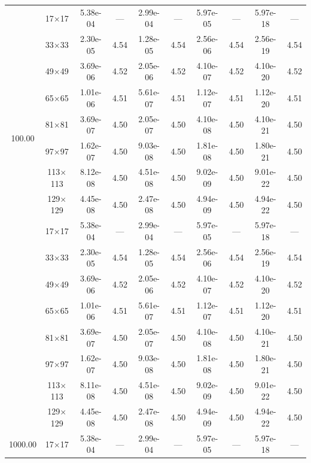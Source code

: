 \begin{table}[H]
{\begin{tabular*}{\textwidth}{@{\extracolsep\fill}c|c|cc|cc|cc|cc@{}}
                \midrule
                \multirow{10}{*}{100.00} & 17$\times$17 & 5.38e-04 & --- & 2.99e-04 & --- & 5.97e-05 & --- & 5.97e-18 & --- \\
                & 33$\times$33 & 2.30e-05 & 4.54 & 1.28e-05 & 4.54 & 2.56e-06 & 4.54 & 2.56e-19 & 4.54 \\
                & 49$\times$49 & 3.69e-06 & 4.52 & 2.05e-06 & 4.52 & 4.10e-07 & 4.52 & 4.10e-20 & 4.52 \\
                & 65$\times$65 & 1.01e-06 & 4.51 & 5.61e-07 & 4.51 & 1.12e-07 & 4.51 & 1.12e-20 & 4.51 \\
                & 81$\times$81 & 3.69e-07 & 4.50 & 2.05e-07 & 4.50 & 4.10e-08 & 4.50 & 4.10e-21 & 4.50 \\
                & 97$\times$97 & 1.62e-07 & 4.50 & 9.03e-08 & 4.50 & 1.81e-08 & 4.50 & 1.80e-21 & 4.50 \\
                & 113$\times$113 & 8.12e-08 & 4.50 & 4.51e-08 & 4.50 & 9.02e-09 & 4.50 & 9.01e-22 & 4.50 \\
                & 129$\times$129 & 4.45e-08 & 4.50 & 2.47e-08 & 4.50 & 4.94e-09 & 4.50 & 4.94e-22 & 4.50 \\
                \midrule
                \multirow{10}{*}{400.00} & 17$\times$17 & 5.38e-04 & --- & 2.99e-04 & --- & 5.97e-05 & --- & 5.97e-18 & --- \\
                & 33$\times$33 & 2.30e-05 & 4.54 & 1.28e-05 & 4.54 & 2.56e-06 & 4.54 & 2.56e-19 & 4.54 \\
                & 49$\times$49 & 3.69e-06 & 4.52 & 2.05e-06 & 4.52 & 4.10e-07 & 4.52 & 4.10e-20 & 4.52 \\
                & 65$\times$65 & 1.01e-06 & 4.51 & 5.61e-07 & 4.51 & 1.12e-07 & 4.51 & 1.12e-20 & 4.51 \\
                & 81$\times$81 & 3.69e-07 & 4.50 & 2.05e-07 & 4.50 & 4.10e-08 & 4.50 & 4.10e-21 & 4.50 \\
                & 97$\times$97 & 1.62e-07 & 4.50 & 9.03e-08 & 4.50 & 1.81e-08 & 4.50 & 1.80e-21 & 4.50 \\
                & 113$\times$113 & 8.11e-08 & 4.50 & 4.51e-08 & 4.50 & 9.02e-09 & 4.50 & 9.01e-22 & 4.50 \\
                & 129$\times$129 & 4.45e-08 & 4.50 & 2.47e-08 & 4.50 & 4.94e-09 & 4.50 & 4.94e-22 & 4.50 \\
                \midrule
                \multirow{10}{*}{1000.00} & 17$\times$17 & 5.38e-04 & --- & 2.99e-04 & --- & 5.97e-05 & --- & 5.97e-18 & --- \\

\end{tabular*}}
\end{table}
